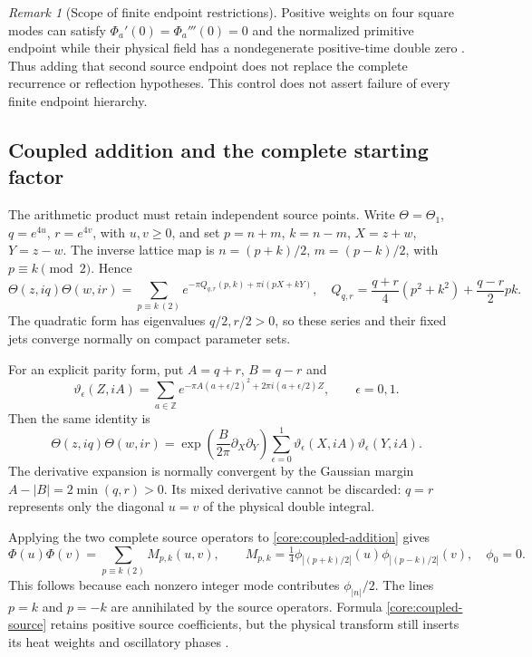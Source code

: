 \documentclass[11pt]{article}
\numberwithin{equation}{section}
\theoremstyle{definition}
\theoremstyle{remark}
\newtheorem{remark}[theorem]{Remark}
\begin{document}
\begin{remark}[Scope of finite endpoint restrictions]
\label{core:finite-endpoint-control}
Positive weights on four square modes can satisfy
$\Phi_a'(0)=\Phi_a'''(0)=0$ and the normalized primitive endpoint
while their physical field has a nondegenerate positive-time double zero
\cite{ThetaTwoEndpoint}.  Thus adding that second source endpoint
does not replace the complete recurrence or reflection hypotheses.
This control does not assert failure of every finite endpoint hierarchy.
\end{remark}

\subsection{Coupled addition and the complete starting factor}
\label{core:coupled-subsection}

The arithmetic product must retain independent source points.  Write
$\Theta=\Theta_1$, $q=e^{4u}$, $r=e^{4v}$, with $u,v\ge0$, and set
$p=n+m$, $k=n-m$, $X=z+w$, $Y=z-w$.  The inverse lattice map is
$n=(p+k)/2$, $m=(p-k)/2$, with $p\equiv k\pmod2$.  Hence
\begin{equation}
 \Theta(z,iq)\Theta(w,ir)
 =\sum_{p\equiv k\ (2)}
       e^{-\pi Q_{q,r}(p,k)+\pi i(pX+kY)},
 \quad
 Q_{q,r}=\frac{q+r}{4}(p^2+k^2)+\frac{q-r}{2}pk .
 \label{core:coupled-addition}
\end{equation}
The quadratic form has eigenvalues $q/2,r/2>0$, so these series and
their fixed jets converge normally on compact parameter sets.

For an explicit parity form, put $A=q+r$, $B=q-r$ and
\[
 \vartheta_\epsilon(Z,iA)=\sum_{a\in\mathbb Z}
 e^{-\pi A(a+\epsilon/2)^2+2\pi i(a+\epsilon/2)Z},
 \qquad \epsilon=0,1.
\]
Then the same identity is
\begin{equation}
 \Theta(z,iq)\Theta(w,ir)
 =\exp\!\left(\frac{B}{2\pi}\partial_X\partial_Y\right)
  \sum_{\epsilon=0}^1
       \vartheta_\epsilon(X,iA)\vartheta_\epsilon(Y,iA).
 \label{core:mixed-parity}
\end{equation}
The derivative expansion is normally convergent by the Gaussian margin
$A-|B|=2\min(q,r)>0$.  Its mixed derivative cannot be discarded:
$q=r$ represents only the diagonal $u=v$ of the physical double integral.

Applying the two complete source operators to
\eqref{core:coupled-addition} gives
\begin{equation}
 \Phi(u)\Phi(v)=\sum_{p\equiv k\ (2)}M_{p,k}(u,v),\qquad
 M_{p,k}=\tfrac14
 \phi_{|(p+k)/2|}(u)\phi_{|(p-k)/2|}(v),\quad \phi_0=0.
 \label{core:coupled-source}
\end{equation}
This follows because each nonzero integer mode contributes
$\phi_{|n|}/2$.  The lines $p=k$ and $p=-k$ are annihilated by the
source operators.  Formula \eqref{core:coupled-source} retains positive
source coefficients, but the physical transform still inserts its
heat weights and oscillatory phases \cite{ThetaCoupled}.
\end{document}
